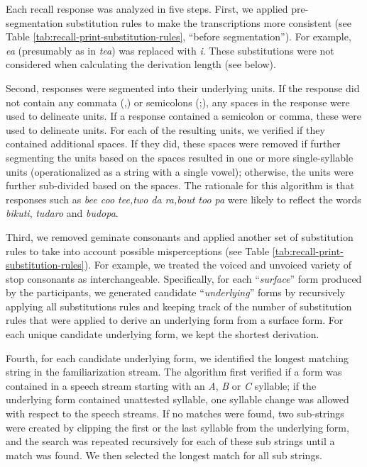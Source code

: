 \documentclass[
]{article}
\begin{document}
Each recall response was analyzed in five steps. First, we applied
pre-segmentation substitution rules to make the transcriptions more
consistent (see Table \ref{tab:recall-print-substitution-rules},
``before segmentation''). For example, \emph{ea} (presumably as in
\emph{tea}) was replaced with \emph{i}. These substitutions were not
considered when calculating the derivation length (see below).

Second, responses were segmented into their underlying units. If the
response did not contain any commata (,) or semicolons (;), any spaces
in the response were used to delineate units. If a response contained a
semicolon or comma, these were used to delineate units. For each of the
resulting units, we verified if they contained additional spaces. If
they did, these spaces were removed if further segmenting the units
based on the spaces resulted in one or more single-syllable units
(operationalized as a string with a single vowel); otherwise, the units
were further sub-divided based on the spaces. The rationale for this
algorithm is that responses such as \emph{bee coo tee,two da ra,bout too
pa} were likely to reflect the words \emph{bikuti}, \emph{tudaro} and
\emph{budopa}.

Third, we removed geminate consonants and applied another set of
substitution rules to take into account possible misperceptions (see
Table \ref{tab:recall-print-substitution-rules}). For example, we
treated the voiced and unvoiced variety of stop consonants as
interchangeable. Specifically, for each ``\emph{surface}'' form produced
by the participants, we generated candidate ``\emph{underlying}'' forms
by recursively applying all substitutions rules and keeping track of the
number of substitution rules that were applied to derive an underlying
form from a surface form. For each unique candidate underlying form, we
kept the shortest derivation.

Fourth, for each candidate underlying form, we identified the longest
matching string in the familiarization stream. The algorithm first
verified if a form was contained in a speech stream starting with an
\emph{A}, \emph{B} or \emph{C} syllable; if the underlying form
contained unattested syllable, one syllable change was allowed with
respect to the speech streams. If no matches were found, two sub-strings
were created by clipping the first or the last syllable from the
underlying form, and the search was repeated recursively for each of
these sub strings until a match was found. We then selected the longest
match for all sub strings.
\end{document}
